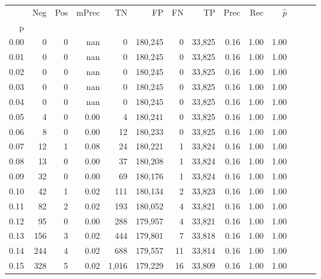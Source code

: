 \begin{tabular}{rrrrrrrrrrrrrr}
\toprule
{} &    Neg &    Pos & mPrec &       TN &       FP &      FN &      TP &  Prec &   Rec & $\hat{p}$ \\
p    &        &        &       &          &          &         &         &       &       &           \\
\midrule
0.00 &      0 &      0 &   nan &        0 &  180,245 &       0 &  33,825 &  0.16 &  1.00 &      1.00 \\
0.01 &      0 &      0 &   nan &        0 &  180,245 &       0 &  33,825 &  0.16 &  1.00 &      1.00 \\
0.02 &      0 &      0 &   nan &        0 &  180,245 &       0 &  33,825 &  0.16 &  1.00 &      1.00 \\
0.03 &      0 &      0 &   nan &        0 &  180,245 &       0 &  33,825 &  0.16 &  1.00 &      1.00 \\
0.04 &      0 &      0 &   nan &        0 &  180,245 &       0 &  33,825 &  0.16 &  1.00 &      1.00 \\
0.05 &      4 &      0 &  0.00 &        4 &  180,241 &       0 &  33,825 &  0.16 &  1.00 &      1.00 \\
0.06 &      8 &      0 &  0.00 &       12 &  180,233 &       0 &  33,825 &  0.16 &  1.00 &      1.00 \\
0.07 &     12 &      1 &  0.08 &       24 &  180,221 &       1 &  33,824 &  0.16 &  1.00 &      1.00 \\
0.08 &     13 &      0 &  0.00 &       37 &  180,208 &       1 &  33,824 &  0.16 &  1.00 &      1.00 \\
0.09 &     32 &      0 &  0.00 &       69 &  180,176 &       1 &  33,824 &  0.16 &  1.00 &      1.00 \\
0.10 &     42 &      1 &  0.02 &      111 &  180,134 &       2 &  33,823 &  0.16 &  1.00 &      1.00 \\
0.11 &     82 &      2 &  0.02 &      193 &  180,052 &       4 &  33,821 &  0.16 &  1.00 &      1.00 \\
0.12 &     95 &      0 &  0.00 &      288 &  179,957 &       4 &  33,821 &  0.16 &  1.00 &      1.00 \\
0.13 &    156 &      3 &  0.02 &      444 &  179,801 &       7 &  33,818 &  0.16 &  1.00 &      1.00 \\
0.14 &    244 &      4 &  0.02 &      688 &  179,557 &      11 &  33,814 &  0.16 &  1.00 &      1.00 \\
0.15 &    328 &      5 &  0.02 &    1,016 &  179,229 &      16 &  33,809 &  0.16 &  1.00 &      1.00 \\

\end{tabular}
